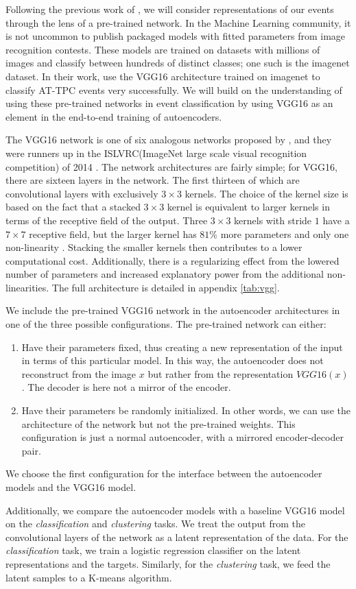Following the previous work of \citet{Kuchera2019}, we will consider representations of our events through the lens of a pre-trained network. In the Machine Learning community, it is not uncommon to publish packaged models with fitted parameters from image recognition contests. These models are trained on datasets with millions of images and classify between hundreds of distinct classes; one such is the imagenet dataset. In their work, \citet{Kuchera2019} use the VGG16 architecture trained on imagenet to classify AT-TPC events very successfully.  We will build on the understanding of using these pre-trained networks in event classification by using VGG16 as an element in the end-to-end training of autoencoders. 

The VGG16 network is one of six analogous networks proposed by \citet{Simonyan2014}, and they were runners up in the ISLVRC(ImageNet large scale visual recognition competition) of 2014 \cite{Russakovsky2015}. The network architectures are fairly simple; for VGG16, there are sixteen layers in the network. The first thirteen of which are convolutional layers with exclusively $3 \times 3$ kernels. The choice of the kernel size is based on the fact that a stacked $3 \times 3$ kernel is equivalent to larger kernels in terms of the receptive field of the output. Three $3 \times 3$ kernels with stride $1$ have a $7 \times 7$ receptive field, but the larger kernel has $81\%$ more parameters and only one non-linearity \cite{Simonyan2014}. Stacking the smaller kernels then contributes to a lower computational cost. Additionally, there is a regularizing effect from the lowered number of parameters and increased explanatory power from the additional non-linearities. The full architecture is detailed in appendix \ref{tab:vgg}.

We include the pre-trained VGG16 network in the autoencoder architectures in one of the three possible configurations. The pre-trained network can either:

\begin{enumerate}
\item Have their parameters fixed, thus creating a new representation of the input in terms of this particular model. In this way, the autoencoder does not reconstruct from the image $x$ but rather from the representation $VGG16(x)$. The decoder is here not a mirror of the encoder.
\item Have their parameters be randomly initialized. In other words, we can use the architecture of the network but not the pre-trained weights. This configuration is just a normal autoencoder, with a mirrored encoder-decoder pair. 
\end{enumerate}

We choose the first configuration for the interface between the autoencoder models and the VGG16 model. 

Additionally, we compare the autoencoder models with a baseline VGG16 model on the \textit{classification} and \textit{clustering} tasks. We treat the output from the convolutional layers of the network as a latent representation of the data. For the \textit{classification} task, we train a logistic regression classifier on the latent representations and the targets. Similarly, for the \textit{clustering} task, we feed the latent samples to a K-means algorithm. 
